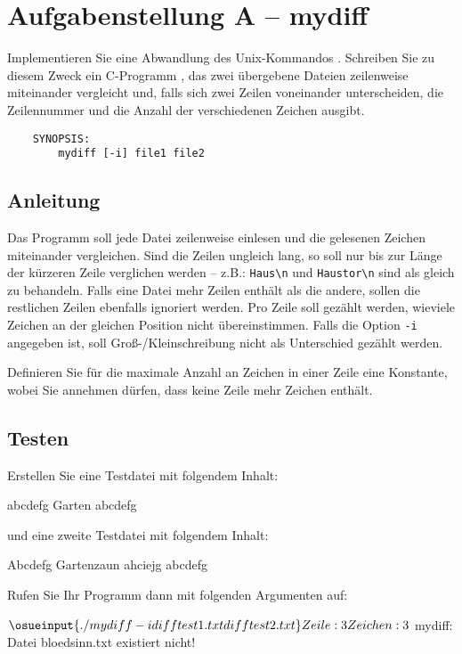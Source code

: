 




\section*{Aufgabenstellung A -- mydiff}
Implementieren Sie eine Abwandlung des Unix-Kommandos .
Schreiben Sie zu diesem Zweck ein C-Programm
, das zwei übergebene Dateien zeilenweise
miteinander vergleicht und, falls sich zwei Zeilen voneinander
unterscheiden, die Zeilennummer und die Anzahl der
verschiedenen Zeichen ausgibt.

\begin{verbatim}
    SYNOPSIS:
        mydiff [-i] file1 file2
\end{verbatim}

\subsection*{Anleitung}
      Das Programm soll jede Datei zeilenweise einlesen und die
      gelesenen Zeichen miteinander vergleichen. Sind die Zeilen
      ungleich lang, so soll nur bis zur Länge der kürzeren Zeile
      verglichen werden -- z.B.: \verb+Haus\n+ und \verb+Haustor\n+
      sind als gleich zu behandeln. Falls eine Datei mehr Zeilen enthält
      als die andere, sollen die restlichen Zeilen ebenfalls ignoriert
      werden. Pro Zeile soll gezählt werden, wieviele Zeichen an der
      gleichen Position nicht übereinstimmen. Falls die Option \verb|-i|
      angegeben ist, soll Groß-/Kleinschreibung nicht als Unterschied
      gezählt werden.

      Definieren Sie für die maximale Anzahl an Zeichen in einer
      Zeile eine Konstante, wobei Sie annehmen dürfen, dass keine
      Zeile mehr Zeichen enthält.

\subsection*{Testen}

Erstellen Sie eine Testdatei  mit folgendem Inhalt:

\begin{osuefmtcode}
      abcdefg
      Garten
      abcdefg
\end{osuefmtcode}

und eine zweite Testdatei  mit folgendem Inhalt:

\begin{osuefmtcode}
      Abcdefg
      Gartenzaun
      ahciejg
      abcdefg
\end{osuefmtcode}

Rufen Sie Ihr Programm dann mit folgenden Argumenten auf:

\begin{osuefmtcode}
    $ \osueinput{./mydiff -i difftest1.txt difftest2.txt}
    Zeile: 3 Zeichen: 3
    $ 
    mydiff: Datei bloedsinn.txt existiert nicht!
\end{osuefmtcode}

\osueguidelinesone


